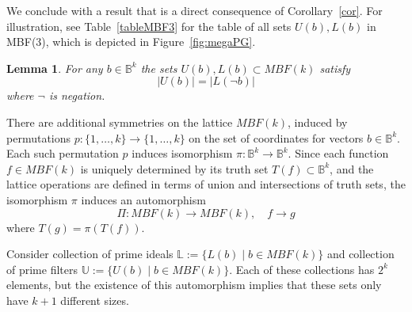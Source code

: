 \documentclass[10pt,letterpaper]{article}
\newcommand{\bbB}{\mathbb{B}}
\newcommand{\bL}{\mathbb{L}}
\newcommand{\bU}{\mathbb{U}}
\newtheorem{lem}[thm]{Lemma}
\begin{document}
We conclude with a result that is a direct consequence of Corollary~\ref{cor}. For illustration, see Table~\ref{tableMBF3} for the table of all sets $U(b), L(b)$ in MBF(3), which is depicted in Figure~\ref{fig:megaPG}.

\begin{lem}\label{lem:neg}
For any $b \in \bbB^k$ the sets $U(b), L(b) \subset MBF(k)$ satisfy 
\[ |U(b)| = |L(\neg b)| \]
where $\neg$ is negation.
\end{lem}




There are additional symmetries on the lattice $MBF(k)$, induced by permutations $p:\{1, \ldots, k\} \to \{1, \ldots, k\}$ on the set of coordinates for vectors $b \in \bbB^k$. Each such permutation $p$ induces isomorphism $\pi: \bbB^k \to \bbB^k$. 
Since each function $f\in MBF(k)$ is uniquely determined by its truth set $T(f) \subset \bbB^k$, and the lattice operations are defined in terms of union and intersections of truth sets, the isomorphism $\pi$ induces an automorphism 
\begin{equation} \label{pi}
\Pi: MBF(k) \to MBF(k),\quad f\to g
\end{equation}
where $T(g) =\pi(T(f))$.

Consider collection of prime ideals $\bL:=\{L(b)\;|\; b \in MBF(k)\} $ and collection of prime filters
$\bU:=\{U(b)\;|\; b \in MBF(k)\}$. Each of these collections has $2^k$ elements, but the existence of this automorphism implies that these sets only have $k+1$ different sizes. 
\end{document}
